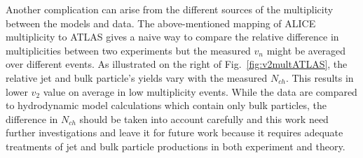 Another complication can arise from the different sources of the multiplicity between the models and data. The above-mentioned mapping of ALICE multiplicity to ATLAS gives a naive way to compare the relative difference in multiplicities between two experiments but the measured $v_n$ might be averaged over different events. As illustrated on the right of Fig.~\ref{fig:v2multATLAS}, the relative jet and bulk particle's yields vary with the measured $N_{ch}$. This results in lower $v_2$ value on average in low multiplicity events. While the data are compared to hydrodynamic model calculations which contain only bulk particles, the difference in $N_{ch}$ should be taken into account carefully and this work need further investigations and leave it for future work because it requires adequate treatments of jet and bulk particle productions in both experiment and theory.